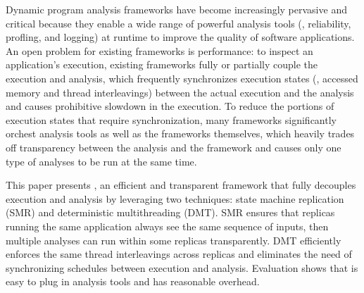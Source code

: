 
Dynamic program analysis frameworks have become increasingly pervasive and 
critical because they enable a wide range of powerful analysis tools (\eg, 
reliability, profling, and logging) at runtime to improve the quality of 
software applications. An open problem for existing frameworks is 
performance: to inspect an application's execution, existing frameworks 
fully or partially couple the execution and analysis, which frequently 
synchronizes execution states (\eg, accessed memory and thread interleavings) 
between the actual execution and the analysis and causes prohibitive slowdown 
in the execution. To reduce the portions of execution states that require 
synchronization, many frameworks significantly orchest analysis tools as well 
as the frameworks themselves, which heavily trades off transparency between the 
analysis and the framework and causes only one type of analyses to be run at 
the same time.


This paper presents \xxx, an efficient and transparent framework that fully 
decouples execution and analysis by leveraging two techniques: state machine 
replication (SMR) and deterministic multithreading (DMT). SMR ensures that 
replicas running the same application always see the same sequence of inputs, 
then multiple analyses can run within some replicas transparently. DMT 
efficiently enforces the same thread interleavings across replicas and 
eliminates the need of synchronizing schedules between execution and analysis. 
Evaluation shows that \xxx is easy to plug in analysis tools and has reasonable 
overhead.